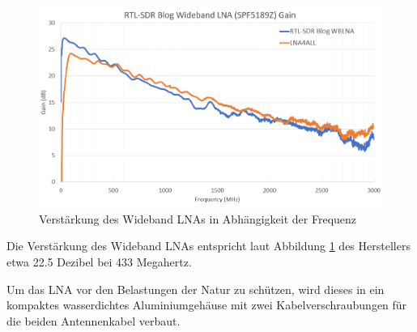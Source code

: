 \begin{figure}[H]
	\centering
	\includegraphics[width=.75\linewidth]{../ref/wideband_lna_gain.png}
	\caption{Verstärkung des Wideband LNAs in Abhängigkeit der Frequenz \cite{noauthor_new_nodate}}
	\label{fig:wideband_lna_gain}
\end{figure}

Die Verstärkung des Wideband LNAs entspricht laut Abbildung \ref{fig:wideband_lna_gain} des Herstellers etwa 22.5 Dezibel bei 433 Megahertz.

Um das LNA vor den Belastungen der Natur zu schützen, wird dieses in ein kompaktes wasserdichtes Aluminiumgehäuse mit zwei Kabelverschraubungen für die beiden Antennenkabel verbaut. 

